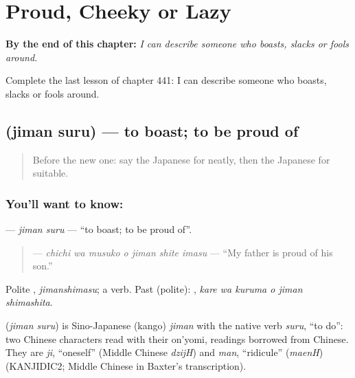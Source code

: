 
\chapter{Proud, Cheeky or Lazy}
\label{ch:ja-proud-cheeky-or-lazy}

\begin{chapteropening}
\textbf{By the end of this chapter:} \emph{I can describe someone who boasts, slacks or fools around.}

Complete the last lesson of chapter 441: I can describe someone who boasts, slacks or fools around.
\end{chapteropening}

\section[\texorpdfstring{\ja{じまんする} (jiman suru)}{じまんする (jiman suru)}]{ (jiman suru) — to boast; to be proud of}

\label{lesson:JA-C441-jiman-suru}



\begin{quote}
Before the new one: say the Japanese for neatly, then the Japanese for suitable.
\end{quote}

\subsection*{You'll want to know: }
\textbf{} — \emph{jiman suru} — \textquotedblleft{}to boast; to be proud of\textquotedblright{}.

\begin{quote}
\textbf{  } — \emph{chichi wa musuko o jiman shite imasu} — \textquotedblleft{}My father is proud of his son.\textquotedblright{}
\end{quote}

Polite \textbf{}, \emph{jimanshimasu}; a  verb. Past (polite): \textbf{  }, \emph{kare wa kuruma o jiman shimashita}.

\begin{cousinweb}
\textbf{} (\emph{jiman suru}) is Sino-Japanese (kango) \emph{jiman} with the native verb \emph{suru}, \textquotedblleft{}to do\textquotedblright{}: two Chinese characters read with their on'yomi, readings borrowed from Chinese. They are \emph{ji}, \textquotedblleft{}oneself\textquotedblright{} (Middle Chinese \emph{dzijH}) and \emph{man}, \textquotedblleft{}ridicule\textquotedblright{} (\emph{maenH}) (KANJIDIC2; Middle Chinese in Baxter's transcription).
\end{cousinweb}

